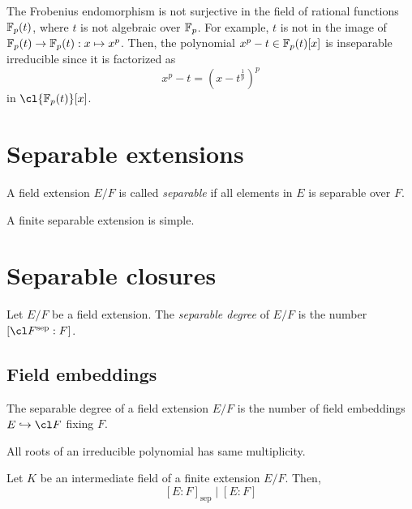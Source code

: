 \documentclass{../note}
\newcommand{\sep}{\mathrm{sep}}
\begin{document}
\begin{ex}
The Frobenius endomorphism is not surjective in the field of rational functions $\mathbb{F}_p(t)$, where $t$ is not algebraic over $\mathbb{F}_p$.
For example, $t$ is not in the image of $\mathbb{F}_p(t)\to\mathbb{F}_p(t):x\mapsto x^p$.
Then, the polynomial $x^p-t\in\mathbb{F}_p(t)[x]$ is inseparable irreducible since it is factorized as
\[x^p-t=(x-t^{\frac1p})^p\]
in $\cl{\F_p(t)}[x]$.
\end{ex}

\section{Separable extensions}
\begin{defn}
A field extension $E/F$ is called \emph{separable} if all elements in $E$ is separable over $F$.
\end{defn}

\begin{thm}
A finite separable extension is simple.
\end{thm}





\section{Separable closures}



\begin{defn}
Let $E/F$ be a field extension.
The \emph{separable degree} of $E/F$ is the number $[\cl F^{\sep}:F]$.
\end{defn}



\subsection{Field embeddings}

\begin{thm}
The separable degree of a field extension $E/F$ is the number of field embeddings $E\emb\cl F$ fixing $F$.
\end{thm}

\begin{lem}
All roots of an irreducible polynomial has same multiplicity.
\end{lem}
\begin{pf}
\end{pf}

\begin{thm}
Let $K$ be an intermediate field of a finite extension $E/F$.
Then,
\[[E:F]_\sep\mid[E:F]\]
\end{thm}
\begin{pf}
\end{pf}
\end{document}
